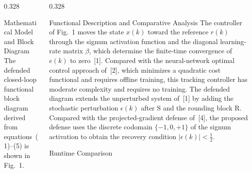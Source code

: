 \documentclass[final]{beamer}
\newlength{\rowBh}          \setlength{\rowBh}{52.1cm}
\newlength{\innergap}       \setlength{\innergap}{0.55cm}
\begin{document}
\begin{frame}[t]
\begin{center}
\begin{minipage}{0.975\textwidth}
\begin{minipage}[t][\rowBh]{\linewidth}
\begin{columns}[T,totalwidth=\linewidth]
\begin{column}{0.328\linewidth}
\begin{posterpanel}[height=\rowBh]{Mathematical Model and Block Diagram}
							The defended closed-loop functional block diagram derived from
							equations~(1)--(5) is shown in Fig.~1.

							\vspace{0.10cm}
							\begin{center}\end{center}
						\end{posterpanel}
					\end{column}
					\begin{column}{0.328\linewidth}
						\begin{minipage}[t][\rowBh][t]{\linewidth}
							\begin{posterpanel}[height=0.315\rowBh]{Functional Description and Comparative Analysis}
								The controller of Fig.~1 moves the state $x(k)$ toward the
								reference $r(k)$ through the signum activation function and the
								diagonal learning-rate matrix $\beta$, which determine the
								finite-time convergence of $e(k)$ to zero~[1]. Compared with
								the neural-network optimal control approach of~[2], which minimizes
								a quadratic cost functional and requires offline training, this
								tracking controller has moderate complexity and requires no
								training. The defended diagram extends the unperturbed system
								of~[1] by adding the stochastic perturbation $\epsilon(k)$
								after $\mathrm{S}$ and the rounding block $\mathrm{R}$. Compared
								with the projected-gradient defense of~[4], the proposed defense
								uses the discrete codomain $\{-1,0,+1\}$ of the signum activation
								to obtain the recovery condition $|\epsilon(k)|<\tfrac{1}{2}$.
							\end{posterpanel}

							\vspace{\innergap}

							\begin{posterpanel}[height=0.395\rowBh]{Runtime Comparison}


\end{posterpanel}
\end{minipage}
\end{column}
\end{columns}
\end{minipage}
\end{minipage}
\end{center}
\end{frame}
\end{document}
